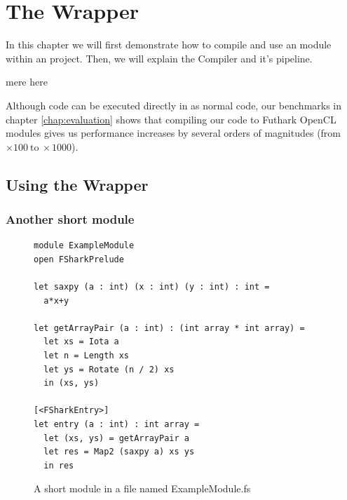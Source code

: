\chapter{The \fshark{} Wrapper}
In this chapter we will first demonstrate how to compile and use an \fshark{}
module within an \fsharp{} project.
Then, we will explain the \fshark{} Compiler and it's pipeline.

mere here

Although \fshark{} code can be executed directly in \fsharp{} as normal
\fsharp{} code, our benchmarks in chapter \ref{chap:evaluation} shows
that compiling our \fshark{} code to Futhark OpenCL modules gives us performance
increases by several orders of magnitudes (from $\times 100~\text{to}~\times 1000$).

\section{Using the \fshark{} Wrapper}
\label{sec:fsharkcompiler}

\subsection{Another short \fshark{} module}
\begin{figure}[H]
  \centering
\begin{verbatim}
module ExampleModule
open FSharkPrelude

let saxpy (a : int) (x : int) (y : int) : int =
  a*x+y

let getArrayPair (a : int) : (int array * int array) =
  let xs = Iota a
  let n = Length xs
  let ys = Rotate (n / 2) xs
  in (xs, ys)

[<FSharkEntry>]
let entry (a : int) : int array =
  let (xs, ys) = getArrayPair a
  let res = Map2 (saxpy a) xs ys
  in res
\end{verbatim}
  \caption{A short \fshark{} module in a file named ExampleModule.fs}
  \label{fig:fsharkusageexample0}
\end{figure}

